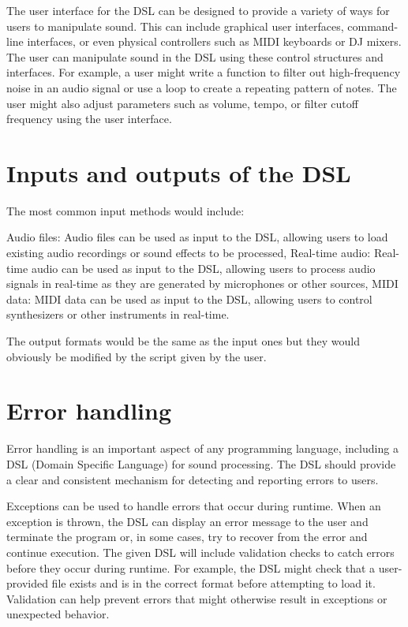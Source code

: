 The user interface for the DSL can be designed to provide a 
variety of ways for users to manipulate sound. This can include 
graphical user interfaces, command-line interfaces, or even 
physical controllers such as MIDI keyboards or DJ mixers.
The user can manipulate sound in the DSL using these control 
structures and interfaces. For example, a user might write a 
function to filter out high-frequency noise in an audio signal or 
use a loop to create a repeating pattern of notes. The user might 
also adjust parameters such as volume, tempo, or filter cutoff 
frequency using the user interface.

\section{Inputs and outputs of the DSL}
The most common input methods would include:
\begin{itemize}
    \hitem Audio files: Audio files can be used as input to the 
    DSL, allowing users to load existing audio recordings or sound 
    effects to be processed,
    \hitem Real-time audio: Real-time audio can be used as input to 
    the DSL, allowing users to process audio signals in real-time 
    as they are generated by microphones or other sources,
    \hitem MIDI data: MIDI data can be used as input to the DSL, 
    allowing users to control synthesizers or other instruments in 
    real-time.
\end{itemize}

The output formats would be the same as the input ones but they 
would obviously be modified by the script given by the user.

\section{Error handling}
Error handling is an important aspect of any programming language, 
including a DSL (Domain Specific Language) for sound processing. 
The DSL should provide a clear and consistent mechanism for 
detecting and reporting errors to users.

Exceptions can be used to handle errors that occur during runtime. 
When an exception is thrown, the DSL can display an error message 
to the user and terminate the program or, in some cases, try to 
recover from the error and continue execution.
The given DSL will include validation checks to catch errors before they occur during runtime. For example, the  DSL might check that a user-provided file exists and is in the correct format before attempting to load it. Validation can help prevent errors that might otherwise result in exceptions or unexpected behavior.

